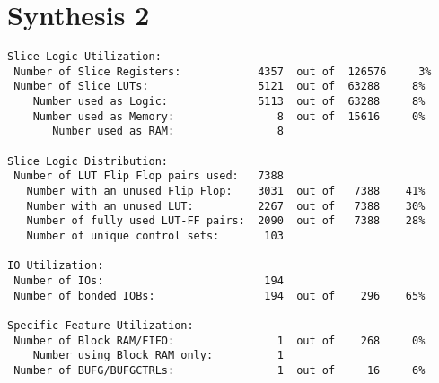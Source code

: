 \section*{Synthesis 2}
\begin{verbatim}
Slice Logic Utilization: 
 Number of Slice Registers:            4357  out of  126576     3%  
 Number of Slice LUTs:                 5121  out of  63288     8%  
    Number used as Logic:              5113  out of  63288     8%  
    Number used as Memory:                8  out of  15616     0%  
       Number used as RAM:                8

Slice Logic Distribution: 
 Number of LUT Flip Flop pairs used:   7388
   Number with an unused Flip Flop:    3031  out of   7388    41%  
   Number with an unused LUT:          2267  out of   7388    30%  
   Number of fully used LUT-FF pairs:  2090  out of   7388    28%  
   Number of unique control sets:       103

IO Utilization: 
 Number of IOs:                         194
 Number of bonded IOBs:                 194  out of    296    65%  

Specific Feature Utilization:
 Number of Block RAM/FIFO:                1  out of    268     0%  
    Number using Block RAM only:          1
 Number of BUFG/BUFGCTRLs:                1  out of     16     6%  
\end{verbatim}
